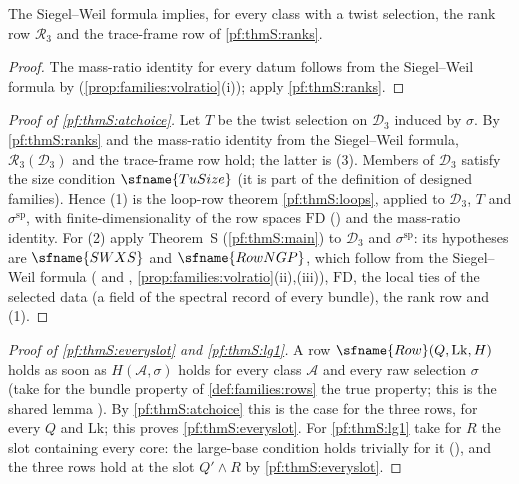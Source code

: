 \begin{corollary}\label{pf:thmS:bothrows}
The Siegel--Weil formula implies, for every class with a twist selection, the rank row $\mathcal{R}_{3}$ and the
trace-frame row of \cref{pf:thmS:ranks}.
\end{corollary}

\begin{proof}
The mass-ratio identity for every datum follows from the Siegel--Weil formula by
 (\cref{prop:families:volratio}(i)); apply
\cref{pf:thmS:ranks}.
\end{proof}

\begin{proof}[Proof of \cref{pf:thmS:atchoice}]
Let $T$ be the twist selection on $\mathcal D_3$ induced by $\sigma$. By \cref{pf:thmS:ranks} and the mass-ratio
identity from the Siegel--Weil formula, $\mathcal{R}_{3}(\mathcal D_3)$ and the trace-frame row hold; the latter is
(3). Members of $\mathcal D_3$ satisfy the size condition $\sfname{TuSize}$ (it is part of the definition of designed
families). Hence (1) is the loop-row theorem \cref{pf:thmS:loops}, applied to $\mathcal D_3$, $T$ and
$\sigma^{\mathrm{sp}}$, with finite-dimensionality of the row spaces $\mathrm{FD}$
() and the mass-ratio identity. For (2) apply Theorem~S
(\cref{pf:thmS:main}) to $\mathcal D_3$ and $\sigma^{\mathrm{sp}}$: its hypotheses are $\sfname{SWXS}$ and
$\sfname{RowNGP}$, which follow from the Siegel--Weil formula
( and ,
\cref{prop:families:volratio}(ii),(iii)), $\mathrm{FD}$, the local ties of the selected data (a field of the
spectral record of every bundle), the rank row and (1).
\end{proof}

\begin{proof}[Proof of \cref{pf:thmS:everyslot} and \cref{pf:thmS:lg1}]
A row $\sfname{Row}(Q,\mathrm{Lk},H)$ holds as soon as $H(\mathcal A,\sigma)$ holds for every class $\mathcal A$ and
every raw selection $\sigma$ (take for the bundle property of \cref{def:families:rows} the true property; this is
the shared lemma ). By \cref{pf:thmS:atchoice} this is the case for the three
rows, for every $Q$ and $\mathrm{Lk}$; this proves \cref{pf:thmS:everyslot}. For \cref{pf:thmS:lg1} take for $R$ the
slot containing every core: the large-base condition holds trivially for it
(), and the three rows hold at the slot $Q'\wedge R$ by
\cref{pf:thmS:everyslot}.
\end{proof}

